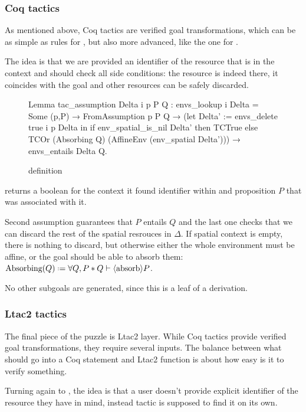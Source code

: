 \subsubsection{Coq tactics}
\label{sec:coq-tactics}

As mentioned above, Coq tactics are verified goal transformations, which can be as simple as rules for , but also more advanced, like the one for .

The idea is that we are provided an identifier of the resource that is in the context and should check all side conditions: the resource is indeed there, it coincides with the goal and other resources can be safely discarded.

\begin{figure}[H]
\begin{coq}
Lemma tac_assumption Delta i p P Q :
  envs_lookup i Delta = Some (p,P) →
  FromAssumption p P Q →
  (let Delta' := envs_delete true i p Delta in
   if env_spatial_is_nil Delta' then TCTrue
   else TCOr (Absorbing Q) (AffineEnv (env_spatial Delta'))) →
  envs_entails Delta Q.
\end{coq}  
\caption{ definition}
\label{fig:tac-assumption}
\end{figure}

 returns a boolean for the context it found identifier  within and proposition \(P\) that was associated with it.

Second assumption guarantees that \(P\) entails \(Q\) and the last one checks that we can discard the rest of the spatial resrouces in \(\Delta\).
If spatial context is empty, there is nothing to discard, but otherwise either the whole environment must be affine, or the goal should be able to absorb them:
\(\Absorbing Q \defeq \forall Q, P * Q \vdash \absorb P\).

No other subgoals are generated, since this is a leaf of a derivation.

\subsubsection{Ltac2 tactics}
\label{sec:ltac2-tactics}

The final piece of the puzzle is Ltac2 layer.
While Coq tactics provide verified goal transformations, they require several inputs.
The balance between what should go into a Coq statement and Ltac2 function is about how easy is it to verify something.

Turning again to , the idea is that a user doesn't provide explicit identifier of the resource they have in mind, instead tactic is supposed to find it on its own.

